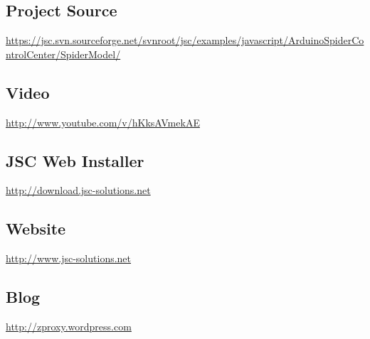 \documentclass[12pt,leqno]{book}
\begin{document}
\subsection{Project Source}
\url{https://jsc.svn.sourceforge.net/svnroot/jsc/examples/javascript/ArduinoSpiderControlCenter/SpiderModel/}



\subsection{Video}
\url{http://www.youtube.com/v/hKksAVmekAE}

\subsection{JSC Web Installer}
\url{http://download.jsc-solutions.net}

\subsection{Website}
\url{http://www.jsc-solutions.net}

\subsection{Blog}
\url{http://zproxy.wordpress.com}
\end{document}
